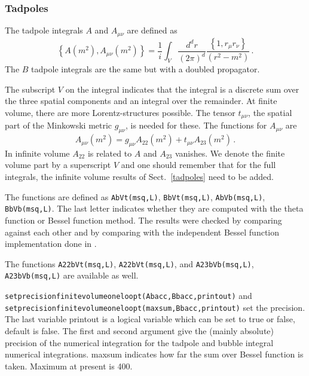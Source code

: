 \documentclass[12pt,a4paper]{article}
\begin{document}
\subsubsection{Tadpoles}

The tadpole integrals $A$ and $A_{\mu\nu}$ are defined as
\begin{equation}
\left\{A(m^2),A_{\mu\nu}(m^2)\right\}
 = \frac{1}{i}\int_V\frac{d^d r}{(2\pi)^d}
\frac{\left\{1,r_\mu r_\nu\right\}}{(r^2-m^2)}\,.
\end{equation}
The $B$ tadpole integrals are the same but with a doubled propagator.

The subscript $V$ on the integral indicates that the integral is a discrete
sum over the three spatial components and an integral over the remainder. 
At finite volume, there are more Lorentz-structures possible. 
The tensor $t_{\mu\nu}$, the spatial part of the Minkowski metric
$g_{\mu\nu}$, is needed for these.
The functions for $A_{\mu\nu}$ are
\begin{equation}
A_{\mu\nu}(m^2) = g_{\mu\nu}A_{22}(m^2)+t_{\mu\nu}A_{23}(m^2)\,.
\end{equation}
In infinite volume $A_{22}$ is related to $A$ and $A_{23}$ vanishes.
We denote the finite volume part by a superscript $V$ and
one should remember that for the full integrals, the infinite volume results
of Sect.~\ref{tadpoles} need to be added.

The functions are defined as \texttt{AbVt(msq,L)},  \texttt{BbVt(msq,L)},
 \texttt{AbVb(msq,L)}, \texttt{BbVb(msq,L)}. The last letter
indicates whether they are computed with the theta function or Bessel
function method.
The results were checked by comparing against each other and
by comparing with the independent Bessel function implementation done in
\cite{Bijnens:2006ve}.

The functions
\texttt{A22bVt(msq,L)},  \texttt{A22bVt(msq,L)},
and \texttt{A23bVb(msq,L)}, \texttt{A23bVb(msq,L)} are available as well.

\texttt{setprecisionfinitevolumeoneloopt(Abacc,Bbacc,printout)}
and\\ \texttt{setprecisionfinitevolumeoneloopt(maxsum,Bbacc,printout)}
set the precision.
The last variable printout is a logical variable which can be set to
true or false, default is false. The first and second argument give the
(mainly absolute) precision of the numerical integration for the
tadpole and bubble integral numerical integrations.
maxsum indicates how far the sum over Bessel function is taken.
Maximum at present is 400.
\end{document}
